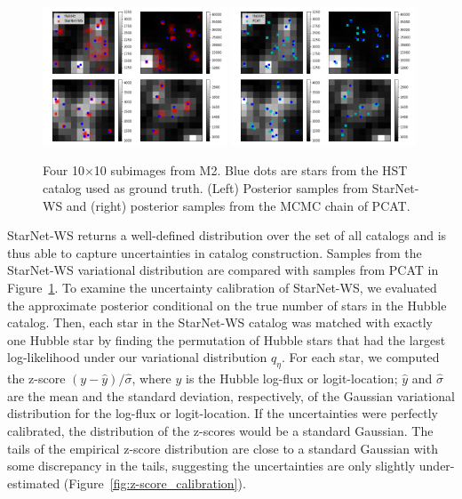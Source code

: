\begin{figure}[ht]
    \centering
    \includegraphics[width=0.49\textwidth]{figures/example_subimages_samples_ws.png}
    \includegraphics[width=0.49\textwidth]{figures/example_subimages_samples_pcat.png}
    \caption{Four 10$\times$10 subimages from
    M2. Blue dots are stars from the HST catalog used as ground truth. (Left) Posterior samples from StarNet-WS and (right) posterior samples from the MCMC chain of PCAT. }
    \label{fig:example_subimages_sampled}
\end{figure}

StarNet-WS returns a well-defined distribution over the set of all catalogs
and is thus able to capture uncertainties in catalog construction. 
Samples from the StarNet-WS variational distribution are compared with samples from PCAT in Figure~\ref{fig:example_subimages_sampled}. 
To examine the uncertainty calibration of StarNet-WS, we evaluated the approximate posterior 
conditional on the true number of stars in the Hubble catalog. 
Then, each star in the StarNet-WS catalog was matched with exactly one Hubble star by finding the permutation of Hubble stars that had the largest log-likelihood under our variational distribution $q_\eta$. 
For each star, we computed the z-score $(y - \hat y) / \hat \sigma$, where $y$ is the Hubble log-flux or 
logit-location; $\hat y$ and $\hat\sigma$ are the mean and the standard deviation, respectively, of the Gaussian variational distribution for the log-flux or logit-location.
If the uncertainties were perfectly calibrated, the distribution of the z-scores would be a standard Gaussian. 
The tails of the empirical z-score distribution are close to a standard Gaussian with some discrepancy in the tails, suggesting the uncertainties are only slightly under-estimated (Figure~\ref{fig:z-score_calibration}). 

